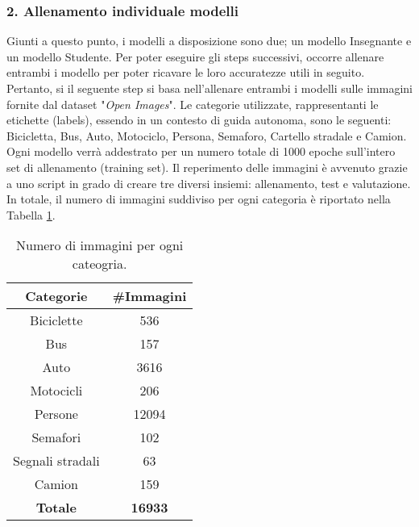 \subsubsection{2. Allenamento individuale modelli}
Giunti a questo punto, i modelli a disposizione sono due; un modello Insegnante e un modello Studente. Per poter eseguire gli steps successivi, occorre allenare entrambi i modello per poter ricavare le loro accuratezze utili in seguito. Pertanto, si il seguente step si basa nell'allenare entrambi i modelli sulle immagini fornite dal dataset "\emph{Open Images}". Le categorie utilizzate, rappresentanti le etichette (labels), essendo in un contesto di guida autonoma, sono le seguenti: Bicicletta, Bus, Auto, Motociclo, Persona, Semaforo, Cartello stradale e Camion. Ogni modello verrà addestrato per un numero totale di 1000 epoche sull'intero set di allenamento (training set). Il reperimento delle immagini è avvenuto grazie a uno script in grado di creare tre diversi insiemi: allenamento, test e valutazione. In totale, il numero di immagini suddiviso per ogni categoria è riportato nella Tabella \ref{images_train}.
\begin{table}
    \centering
    \begin{adjustbox}{max width=\textwidth}
    \begin{tabular}{|c|c|}
        \hline
        \bfseries{Categorie} & \bfseries{\#Immagini}\\
        \hline
        \hline
        Biciclette & 536 \\
        \hline
        Bus & 157 \\
        \hline
        Auto & 3616 \\
        \hline
        Motocicli & 206\\
        \hline
        Persone & 12094\\
        \hline
        Semafori & 102\\
        \hline
        Segnali stradali & 63\\
        \hline
        Camion & 159\\
        \hline
        \hline
        {\bfseries{Totale}} & {\bfseries{16933}} \\
        \hline
    \end{tabular}
    \end{adjustbox}
    \vspace{0.5cm}
    \caption{Numero di immagini per ogni cateogria.}
    \label{images_train}
\end{table}
